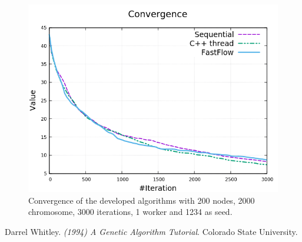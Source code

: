 \documentclass[a4paper,10pt]{article}
\begin{document}
	\begin{figure}[H]
	\centering
	\includegraphics[width=\linewidth]{img/convergence.png}
	\caption{Convergence of the developed algorithms with 200 nodes, 2000 chromosome, 3000 iterations, 1 worker and 1234 as seed.}
	\label{convergence}
\end{figure}


\begin{thebibliography}{9}
	
	Darrel Whitley.
	\textit{(1994) A Genetic Algorithm Tutorial}. Colorado State University.
	
		
\end{thebibliography}
\end{document}
